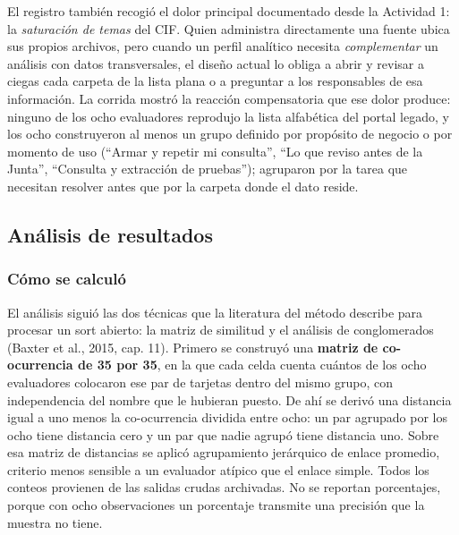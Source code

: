 El registro también recogió el dolor principal documentado desde la Actividad 1: la \textit{saturación de temas} del CIF. Quien administra directamente una fuente ubica sus propios archivos, pero cuando un perfil analítico necesita \textit{complementar} un análisis con datos transversales, el diseño actual lo obliga a abrir y revisar a ciegas cada carpeta de la lista plana o a preguntar a los responsables de esa información. La corrida mostró la reacción compensatoria que ese dolor produce: ninguno de los ocho evaluadores reprodujo la lista alfabética del portal legado, y los ocho construyeron al menos un grupo definido por propósito de negocio o por momento de uso (``Armar y repetir mi consulta'', ``Lo que reviso antes de la Junta'', ``Consulta y extracción de pruebas''); agruparon por la tarea que necesitan resolver antes que por la carpeta donde el dato reside.

\subsection{Análisis de resultados}

\subsubsection{Cómo se calculó}
El análisis siguió las dos técnicas que la literatura del método describe para procesar un sort abierto: la matriz de similitud y el análisis de conglomerados (Baxter et al., 2015, cap. 11). Primero se construyó una \textbf{matriz de co-ocurrencia de 35 por 35}, en la que cada celda cuenta cuántos de los ocho evaluadores colocaron ese par de tarjetas dentro del mismo grupo, con independencia del nombre que le hubieran puesto. De ahí se derivó una distancia igual a uno menos la co-ocurrencia dividida entre ocho: un par agrupado por los ocho tiene distancia cero y un par que nadie agrupó tiene distancia uno. Sobre esa matriz de distancias se aplicó agrupamiento jerárquico de enlace promedio, criterio menos sensible a un evaluador atípico que el enlace simple. Todos los conteos provienen de las salidas crudas archivadas. No se reportan porcentajes, porque con ocho observaciones un porcentaje transmite una precisión que la muestra no tiene.


